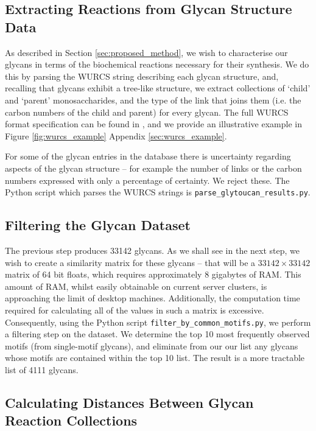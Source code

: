 \documentclass[12pt,a4paper]{article}
\begin{document}
\subsection{Extracting Reactions from Glycan Structure Data}
\label{sec:extracting_reactions}

As described in Section \ref{sec:proposed_method}, we wish to characterise our glycans in terms of the biochemical reactions necessary for their synthesis. We do this by parsing the WURCS string describing each glycan structure, and, recalling that glycans exhibit a tree-like structure, we extract collections of `child' and `parent' monosaccharides, and the type of the link that joins them (i.e. the carbon numbers of the child and parent) for every glycan. The full WURCS format specification can be found in \citep{matsubara2017wurcs}, and we provide an illustrative example in Figure \ref{fig:wurcs_example} Appendix \ref{sec:wurcs_example}.


For some of the glycan entries in the database there is uncertainty regarding aspects of the glycan structure -- for example the number of links or the carbon numbers expressed with only a percentage of certainty. We reject these. The Python script which parses the WURCS strings is \texttt{parse\_glytoucan\_results.py}.

\subsection{Filtering the Glycan Dataset}
\label{sec:filtering_glycans}
The previous step produces 33142 glycans. As we shall see in the next step, we wish to create a similarity matrix for these glycans -- that will be a $33142\times33142$ matrix of 64 bit floats, which requires approximately 8 gigabytes of RAM. This amount of RAM, whilst easily obtainable on current server clusters, is approaching the limit of desktop machines. Additionally, the computation time required for calculating all of the values in such a matrix is excessive. Consequently, using the Python script \texttt{filter\_by\_common\_motifs.py}, we perform a filtering step on the dataset. We determine the top 10 most frequently observed motifs (from single-motif glycans), and eliminate from our our list any glycans whose motifs are contained within the top 10 list. The result is a more tractable list of 4111 glycans.


\subsection{Calculating Distances Between Glycan Reaction Collections}
\label{sec:distance_calc_set}
\end{document}
